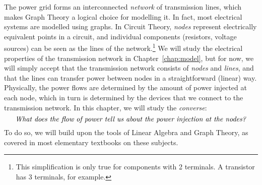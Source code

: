 \documentclass[main.tex]{subfiles}
\begin{document}

The power grid forms an interconnected \emph{network} of transmission lines, which makes Graph Theory a logical choice for modelling it.
In fact, most electrical systems are modelled using graphs. In Circuit Theory, \emph{nodes} represent electrically equivalent points in a circuit, and individual components (resistors, voltage sources) can be seen as the lines of the network.\footnote{This simplification is only true for components with 2 terminals. A transistor has 3 terminals, for example.}
We will study the electrical properties of the transmission network in Chapter~\ref{chap:model}, but for now, we will simply accept that the transmission network consists of \emph{nodes} and \emph{lines}, and that the lines can transfer power between nodes in a straightforward (linear) way. Physically, the power flows are determined by the amount of power injected at each node, which in turn is determined by the devices that we connect to the transmission network. In this chapter, we will study the \emph{converse}:
\[
\text{\textit{What does the flow of power tell us about the power injection at the nodes?}}
\]
To do so, we will build upon the tools of Linear Algebra and Graph Theory, as covered in most elementary textbooks on these subjects.
\end{document}
